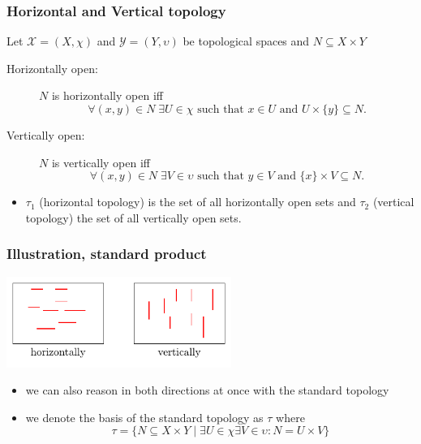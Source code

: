 \documentclass[hyperref={pdfpagelabels=false},t,10pt]{beamer}
\begin{document}
\begin{frame}
  \frametitle{Horizontal and Vertical topology}
  \begin{definition}
      Let \( \mathcal{X} = (X, \chi) \) and \( \mathcal{Y} = (Y, \upsilon) \) be topological spaces and \( N \subseteq X \times Y \) \newline

    \begin{description}
      \item[Horizontally open:] \(N\) is horizontally open iff 
      \[
        \forall (x, y) \in N\; \exists U \in \chi \text{ such that } x \in U \text{ and } U \times \{y\} \subseteq N.
      \]

      \item[Vertically open:] \(N\) is vertically open iff 
      \[
        \forall (x, y) \in N\; \exists V \in \upsilon \text{ such that } y \in V \text{ and } \{x\} \times V \subseteq N.
      \]

    \end{description}    
  \end{definition}

\begin{itemize}
  \item $\tau_1$ (horizontal topology) is the set of all horizontally open sets and $\tau_2$ (vertical topology) the set of all vertically open sets.
\end{itemize}



\end{frame}

\begin{frame}
  \frametitle{Illustration, standard product}
    \centering
    \includegraphics[width=0.55\textwidth]{Example4.pdf} \pause
  \begin{itemize}
    \item we can also reason in both directions at once with the standard topology
    \item we denote the basis of the standard topology as $\tau$ where 
    $$\tau = \{N \subseteq X \times Y \mid \exists U \in \chi \exists V \in \upsilon: N = U \times V\}$$  
  \end{itemize}

\end{frame}
\end{document}
